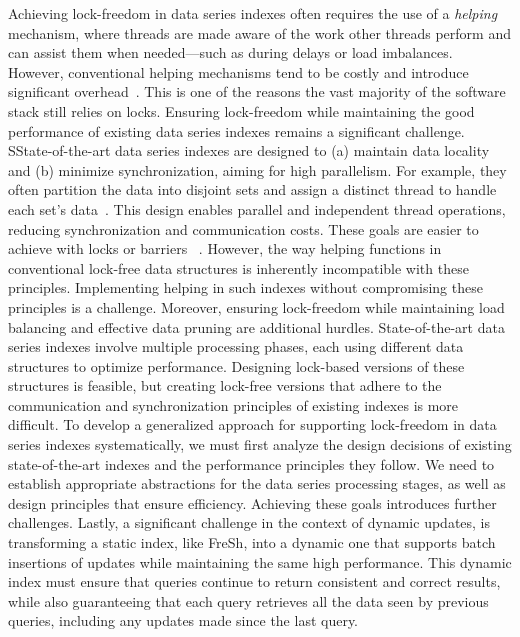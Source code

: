 \documentclass[a4paper,11pt,twoside,openany]{book}
\begin{document}
Achieving lock-freedom in data series indexes often requires the use of a {\em helping} mechanism,
where threads are made aware of the work other threads perform and can assist them when
needed—such as during delays or load imbalances. However, conventional helping mechanisms
tend to be costly and introduce significant overhead~\cite{F04,HS08,7515610,Williams2012CCI}.
This is one of the reasons the vast majority of the software stack still relies on locks.
Ensuring lock-freedom while maintaining the good performance of existing data series indexes 
remains a significant challenge.
%
SState-of-the-art data series indexes are designed to (a) maintain data locality
and (b) minimize synchronization, aiming for high parallelism. 
For example, they often partition the data into disjoint sets and assign a distinct thread to 
handle each set's data~\cite{parisplus,PFP21-I,PFP21-II}.
This design enables parallel and independent thread operations, reducing synchronization
and communication costs. These goals are easier to achieve with locks or barriers
~\cite{peng2018paris,peng2020messi,PFP21-I,PFP21-II}.
%
However, the way helping functions in conventional lock-free data structures is inherently
incompatible with these principles. Implementing helping in such indexes without compromising
these principles is a challenge.
%
Moreover, ensuring lock-freedom while maintaining load balancing and effective data pruning
are additional hurdles. State-of-the-art data series indexes involve multiple processing phases,
each using different data structures to optimize performance. Designing lock-based versions of
these structures is feasible, but creating lock-free versions that adhere to the communication
and synchronization principles of existing indexes is more difficult.
%
To develop a generalized approach for supporting lock-freedom in data series indexes systematically,
we must first analyze the design decisions of existing state-of-the-art indexes and the performance
principles they follow. We need to establish appropriate abstractions for the data series processing
stages, as well as design principles that ensure efficiency. Achieving these goals introduces further
challenges.
%
Lastly, a significant challenge in the context of dynamic updates, is transforming
a static index, like FreSh, into a dynamic one that supports batch insertions of updates while 
maintaining the same high performance. This dynamic index must ensure that queries continue to 
return consistent and correct results, while also guaranteeing that each query retrieves all the 
data seen by previous queries, including any updates made since the last query.
\end{document}
